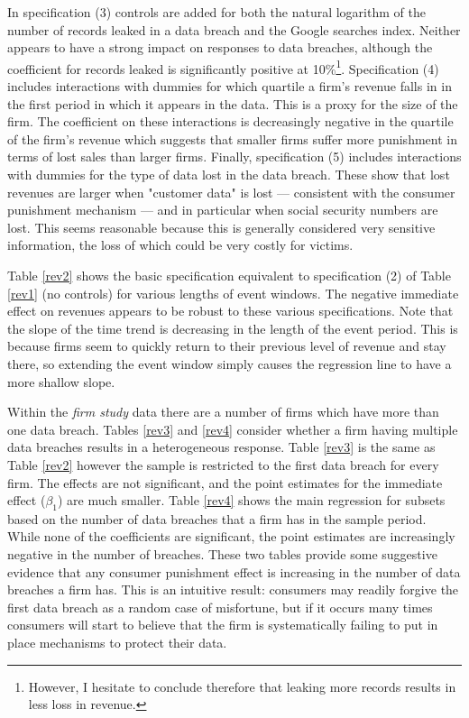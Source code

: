 \documentclass[../Main.tex]{subfiles}
\begin{document}
In specification (3) controls are added for both the natural logarithm of the number of records leaked in a data breach and the Google searches index. Neither appears to have a strong impact on responses to data breaches, although the coefficient for records leaked is significantly positive at 10\%\footnote{However, I hesitate to conclude therefore that leaking more records results in less loss in revenue.}. Specification (4) includes interactions with dummies for which quartile a firm's revenue falls in in the first period in which it appears in the data. This is a proxy for the size of the firm. The coefficient on these interactions is decreasingly negative in the quartile of the firm's revenue which suggests that smaller firms suffer more punishment in terms of lost sales than larger firms. Finally, specification (5) includes interactions with dummies for the type of data lost in the data breach. These show that lost revenues are larger when "customer data" is lost --- consistent with the consumer punishment mechanism --- and in particular when social security numbers are lost. This seems reasonable because this is generally considered very sensitive information, the loss of which could be very costly for victims.

Table \ref{rev2} shows the basic specification equivalent to specification (2) of Table \ref{rev1} (no controls) for various lengths of event windows. The negative immediate effect on revenues appears to be robust to these various specifications. Note that the slope of the time trend is decreasing in the length of the event period. This is because firms seem to quickly return to their previous level of revenue and stay there, so extending the event window simply causes the regression line to have a more shallow slope.

Within the \textit{firm study} data there are a number of firms which have more than one data breach. Tables \ref{rev3} and \ref{rev4} consider whether a firm having multiple data breaches results in a heterogeneous response. Table \ref{rev3} is the same as Table \ref{rev2} however the sample is restricted to the first data breach for every firm. The effects are not significant, and the point estimates for the immediate effect ($\beta_1$) are much smaller. Table \ref{rev4} shows the main regression for subsets based on the number of data breaches that a firm has in the sample period. While none of the coefficients are significant, the point estimates are increasingly negative in the number of breaches. These two tables provide some suggestive evidence that any consumer punishment effect is increasing in the number of data breaches a firm has. This is an intuitive result: consumers may readily forgive the first data breach as a random case of misfortune, but if it occurs many times consumers will start to believe that the firm is systematically failing to put in place mechanisms to protect their data. 
\end{document}

